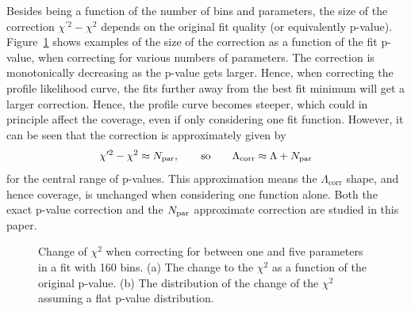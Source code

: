 \begin{enumerate}
Besides being a function of the number of bins and parameters,
the size of the correction $\chi^{\prime 2} - \chi^2$
depends on the original fit quality
(or equivalently p-value). Figure~\ref{fig:correction:DeltaChiSq}
shows examples of the size of the correction as a function of the
fit p-value, when correcting for various numbers of parameters.
The correction is monotonically decreasing as the p-value gets larger.
Hence, when correcting the profile likelihood curve, the fits further away from
the best fit minimum will get a larger correction. Hence, the profile curve
becomes steeper, which could in principle affect the coverage, even if
only considering one fit function.
However, it can be seen that the correction is approximately given by
\begin{displaymath}
\chi^{\prime 2} - \chi^2 \approx N_{\rm par},
\qquad{\rm so}\qquad
\Lambda_{\mathrm{corr}} \approx \textrm{\ensuremath{\Lambda}} + N_{\rm par}
\end{displaymath}
for the central range of p-values. This approximation means the
$\Lambda_{\mathrm{corr}}$ shape, and hence coverage, is unchanged when considering one function alone. Both the
exact p-value
correction and the $N_{\rm par}$ approximate correction are studied in this paper.
%
\begin{figure}[tbp]
\centering
\caption{Change of $\chi^2$ when correcting for between one and five parameters
in a fit with 160 bins. (a) The change to the $\chi^2$ as a function of the
original p-value. (b) The distribution of the change of
the $\chi^2$ assuming a flat p-value distribution.}
\label{fig:correction:DeltaChiSq}
\end{figure}



\end{enumerate}

